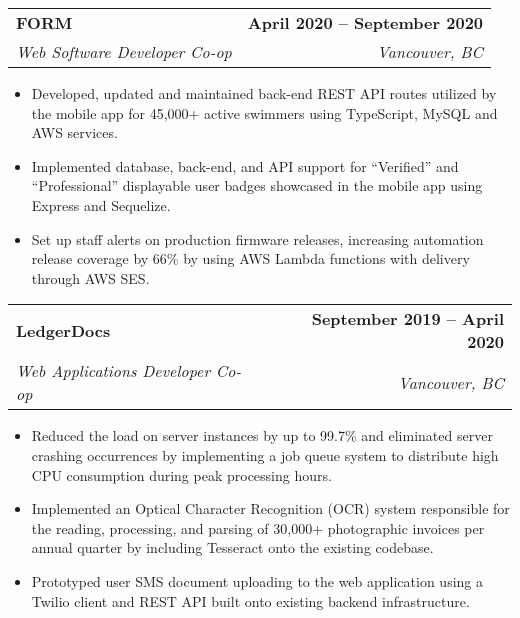 \documentclass[letterpaper,11pt]{article}
\makeatletter
\newcommand{\resumeItem}[1]{
  \item\small{
    {#1 \vspace{-3pt}}
  }
}
\newcommand{\resumeSubheading}[4]{
  \vspace{-1pt}\item
    \begin{tabular*}{0.97\textwidth}[t]{l@{\extracolsep{\fill}}r}
      \textbf{#1} & #2 \\
      \textit{\small#3} & \textit{\small #4} \\
    \end{tabular*}\vspace{-5pt}
}
\newcommand{\resumeSubSubheading}[2]{
    \item
    \begin{tabular*}{0.97\textwidth}{l@{\extracolsep{\fill}}r}
      \textit{\small#1} & \textit{\small #2} \\
    \end{tabular*}\vspace{-5pt}
}
\newcommand{\resumeSubHeadingListEnd}{\end{itemize}}
\newcommand{\resumeItemListStart}{\begin{itemize}}
\newcommand{\resumeItemListEnd}{\end{itemize}\vspace{-6pt}}
\makeatother
\begin{document}
    \resumeSubheading
      {FORM} {\textbf{April 2020 -- September 2020}}
      {Web Software Developer Co-op}{Vancouver, BC}
      \resumeItemListStart
        \resumeItem{Developed, updated and maintained back-end REST API routes utilized by the mobile app for 45,000+ active swimmers using TypeScript, MySQL and AWS services.}
        \resumeItem{Implemented database, back-end, and API support for ``Verified'' and ``Professional'' displayable user badges showcased in the mobile app using Express and Sequelize.}
        \resumeItem{Set up staff alerts on production firmware releases, increasing automation release coverage by 66\% by using AWS Lambda functions with delivery through AWS SES.}
      \resumeItemListEnd

    \resumeSubheading
      {LedgerDocs}{\textbf{September 2019 -- April 2020}}
      {Web Applications Developer Co-op}{Vancouver, BC}
      \resumeItemListStart
        \resumeItem{Reduced the load on server instances by up to 99.7\% and eliminated server crashing occurrences by implementing a job queue system to distribute high CPU consumption during peak processing hours.}
        \resumeItem{Implemented an Optical Character Recognition (OCR) system responsible for the reading, processing, and parsing of 30,000+ photographic invoices per annual quarter by including Tesseract onto the existing codebase.}
        \resumeItem{Prototyped user SMS document uploading to the web application using a Twilio client and REST API built onto existing backend infrastructure.}
      \resumeItemListEnd

      

\end{document}
